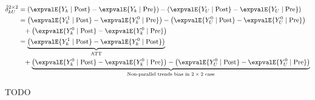 \begin{subequations} \label{eq:DID:2x2}
\begin{align}
\hat{\delta}_{kU}^{2 \times 2} &= \left( \expvalE{Y_{k} \mid \text{Post}} - \expvalE{Y_{k} \mid \text{Pre}} \right)
- \left( \expvalE{Y_{U} \mid \text{Post}} - \expvalE{Y_{U} \mid \text{Pre}} \right) \label{eq:DID:2x2:def} \\
&= \left( \expvalE{Y_{k}^{1} \mid \text{Post}} - \expvalE{Y_{k}^{0} \mid \text{Pre}} \right)
- \left( \expvalE{Y_{U}^{0} \mid \text{Post}} - \expvalE{Y_{U}^{0} \mid \text{Pre}} \right) \label{eq:DID:2x2:expand} \\
&\hphantom{=} + \left( \expvalE{Y_{k}^{0} \mid \text{Post}} - \expvalE{Y_{k}^{0} \mid \text{Pre}} \right) \label{eq:DID:2x2:add_zero} \\
&= \underbrace{\left( \expvalE{Y_{k}^{1} \mid \text{Post}} - \expvalE{Y_{k}^{0} \mid \text{Post}} \right)}_{\text{ATT}} \label{eq:DID:2x2:ATT} \\
&\hphantom{=} + \underbrace{
\left( \expvalE{Y_{k}^{0} \mid \text{Post}} - \expvalE{Y_{k}^{0} \mid \text{Pre}} \right)
- \left( \expvalE{Y_{U}^{0} \mid \text{Post}} - \expvalE{Y_{U}^{0} \mid \text{Pre}} \right)
}_{\text{Non-parallel trends bias in $2\times 2$ case}} \label{eq:DID:2x2:nonparallel_trends_bias}
\end{align}
\end{subequations}

TODO


